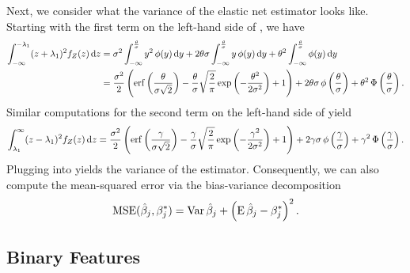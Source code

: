 Next, we consider what the variance of the elastic net estimator looks like.
Starting with the first term on the left-hand side of , we have
\begin{align}
  \label{eq:mc-var-part1}
  \int_{-\infty}^{-\lambda_1}(z+ \lambda_1)^2 f_Z(z) \mathop{}\!\mathrm{d} z & = \sigma^2 \int_{-\infty}^{\frac{\theta}{\sigma}} y^2 \operatorname{\phi}(y) \mathop{}\!\mathrm{d} y + 2 \theta \sigma \int_{-\infty}^{\frac{\theta}{\sigma}} y \operatorname{\phi}(y) \mathop{}\!\mathrm{d} y + \theta^2 \int_{-\infty}^{\frac{\theta}{\sigma}} \operatorname{\phi}(y) \mathop{}\!\mathrm{d} y                                                                               \nonumber \\
                                                           & = \frac{\sigma^2}{2} \left( \operatorname{erf}\left(\frac{\theta}{\sigma\sqrt{2}}\right) - \frac{\theta}{\sigma}\sqrt{\frac{2}{\pi}} \exp\left(-\frac{\theta^2}{2\sigma^2}\right) + 1 \right) + 2 \theta \sigma \operatorname{\phi} \left(\frac{\theta}{\sigma}\right) + \theta^2 \operatorname{\Phi}\left(\frac{\theta}{\sigma}\right).
\end{align}
Similar computations for the second term on the left-hand side of  yield
\begin{equation}
  \label{eq:mc-var-part2}
  \int_{\lambda_1}^{\infty}(z - \lambda_1)^2 f_Z(z) \mathop{}\!\mathrm{d} z = \frac{\sigma^2}{2} \left( \operatorname{erf}\left(\frac{\gamma}{\sigma\sqrt{2}}\right) - \frac{\gamma}{\sigma}\sqrt{\frac{2}{\pi}} \exp\left(-\frac{\gamma^2}{2\sigma^2}\right) + 1 \right) + 2 \gamma \sigma \operatorname{\phi} \left(\frac{\gamma}{\sigma}\right) + \gamma^2 \operatorname{\Phi}\left(\frac{\gamma}{\sigma}\right).
\end{equation}
Plugging  into  yields the variance of the estimator. Consequently, we can also compute the mean-squared error via the bias-variance decomposition
\begin{equation*}
  \label{eq:betahat-mse}
  \operatorname{MSE} (\hat\beta_j, \beta^*_j) = \operatorname{Var}\hat\beta_j + \left(\operatorname{E} \hat\beta_j - \beta^*_j\right)^2.
\end{equation*}

\subsection{Binary Features}

